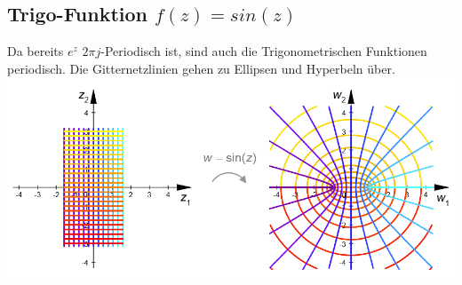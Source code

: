 \subsection{Trigo-Funktion $f(z) = sin(z)$}
Da bereits $e^z$ $2\pi j$-Periodisch ist, sind auch die Trigonometrischen Funktionen periodisch. Die Gitternetzlinien gehen zu Ellipsen und Hyperbeln über.
\includegraphics[width=\columnwidth]{Images/sinus_funktion}